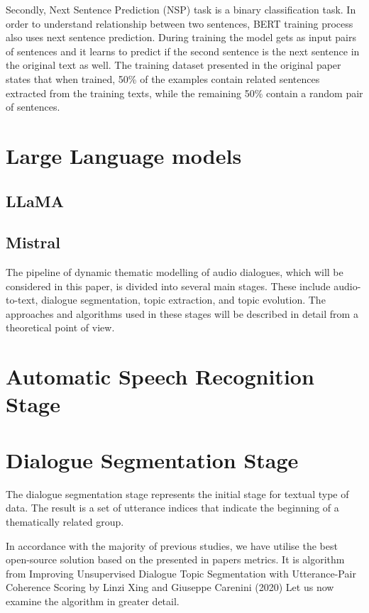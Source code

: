 \documentclass[PMI,VKR]{HSEUniversity}
\begin{document}
Secondly, Next Sentence Prediction (NSP) task is a binary classification task. 
In order to understand relationship between two sentences, BERT training process also uses next sentence prediction.
During training the model gets as input pairs of sentences and it learns to predict if the second sentence is the next sentence in the original text as well. 
The training dataset presented in the original paper states that when trained, 50\% of the examples contain related sentences extracted from the training texts, while the remaining 50\% contain a random pair of sentences.


\section{Large Language models}


\subsection{LLaMA}


\subsection{Mistral}



The pipeline of dynamic thematic modelling of audio dialogues, which will be considered in this paper, is divided into several main stages. 
These include audio-to-text, dialogue segmentation, topic extraction, and topic evolution. 
The approaches and algorithms used in these stages will be described in detail from a theoretical point of view.


\section{Automatic Speech Recognition Stage}


\section{Dialogue Segmentation Stage}

The dialogue segmentation stage represents the initial stage for textual type of data. 
The result is a set of utterance indices that indicate the beginning of a thematically related group. 

In accordance with the majority of previous studies, we have utilise the best open-source solution based on the presented in papers metrics. 
It is algorithm from Improving Unsupervised Dialogue Topic Segmentation with Utterance-Pair Coherence Scoring by Linzi Xing and Giuseppe Carenini (2020)
Let us now examine the algorithm in greater detail. 
\end{document}
